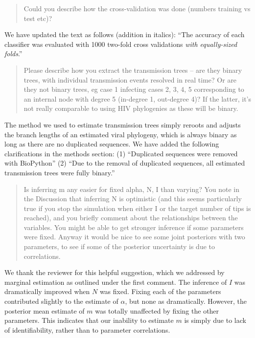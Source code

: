 \documentclass[12pt]{letter}
\begin{document}
\begin{letter}{ }
\begin{quote}
  \itshape

  Could you describe how the cross-validation was done (numbers training vs
  test etc)?
\end{quote}

We have updated the text as follows (addition in italics): ``The accuracy of
each classifier was evaluated with 1000 two-fold cross validations \emph{with
equally-sized folds}.''

\begin{quote}
  \itshape

  Please describe how you extract the transmission trees -- are they binary
  trees, with individual transmission events resolved in real time? Or are they
  not binary trees, eg case 1 infecting cases 2, 3, 4, 5 corresponding to an
  internal node with degree 5 (in-degree 1, out-degree 4)? If the latter, it's
  not really comparable to using HIV phylogenies as these will be binary.
\end{quote}

The method we used to estimate transmission trees simply reroots and adjusts
the branch lengths of an estimated viral phylogeny, which is always binary as
long as there are no duplicated sequences. We have added the following
clarifications in the methods section: (1) ``Duplicated sequences were removed
with BioPython'' (2) ``Due to the removal of duplicated sequences, all
estimated transmission trees were fully binary.''

\begin{quote}
  \itshape

  Is inferring m any easier for fixed alpha, N, I than varying? You note in the
  Discussion that inferring N is optimistic (and this seems particularly true
  if you stop the simulation when either I or the target number of tips is
  reached), and you briefly comment about the relationships between the
  variables. You might be able to get stronger inference if some parameters
  were fixed. Anyway it would be nice to see some joint posteriors with two
  parameters, to see if some of the posterior uncertainty is due to
  correlations.
\end{quote}

We thank the reviewer for this helpful suggestion, which we addressed by
marginal estimation as outlined under the first comment. The inference of $I$
was dramatically improved when $N$ was fixed. Fixing each of the parameters
contributed slightly to the estimate of $\alpha$, but none as dramatically.
However, the posterior mean estimate of $m$ was totally unaffected by fixing
the other parameters. This indicates that our inability to estimate $m$ is
simply due to lack of identifiability, rather than to parameter correlations. 


\end{letter}
\end{document}
